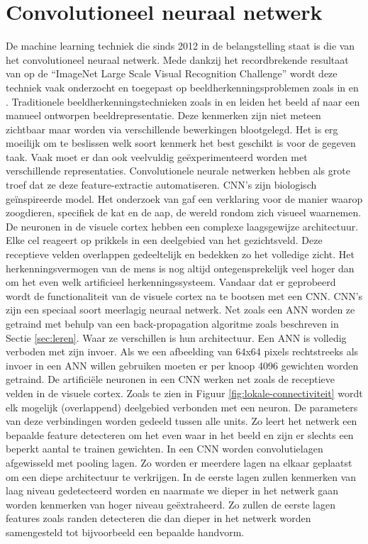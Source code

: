 \section{Convolutioneel neuraal netwerk}
De machine learning techniek die sinds 2012 in de belangstelling staat is die van het convolutioneel neuraal netwerk. Mede dankzij het recordbrekende resultaat van \cite{cnn-krizhevsky} op de ``ImageNet Large Scale Visual Recognition Challenge'' wordt deze techniek vaak onderzocht en toegepast op beeldherkenningsproblemen zoals in \cite{cnn-ji} en \cite{cnn-karpathy}.
\npar Traditionele beeldherkenningstechnieken zoals in \cite{perronnin2010improving} en \cite{jhuang2007biologically} leiden het beeld af naar een manueel ontworpen beeldrepresentatie. Deze kenmerken zijn niet meteen zichtbaar maar worden via verschillende bewerkingen blootgelegd. Het is erg moeilijk om te beslissen welk soort kenmerk het best geschikt is voor de gegeven taak. Vaak moet er dan ook veelvuldig ge\"experimenteerd worden met verschillende representaties.
\npar Convolutionele neurale netwerken hebben als grote troef dat ze deze feature-extractie automatiseren. CNN's zijn biologisch ge\"inspireerde model. Het onderzoek van \cite{hubel1968receptive} gaf een verklaring voor de manier waarop zoogdieren, specifiek de kat en de aap, de wereld rondom zich visueel waarnemen. De neuronen in de visuele cortex hebben een complexe laagsgewijze architectuur. Elke cel reageert op prikkels in een deelgebied van het gezichtsveld. Deze receptieve velden overlappen gedeeltelijk en bedekken zo het volledige zicht.
\npar Het herkenningsvermogen van de mens is nog altijd ontegensprekelijk veel hoger dan om het even welk artificieel herkenningssysteem. Vandaar dat er geprobeerd wordt de functionaliteit van de visuele cortex na te bootsen met een CNN. 
\npar CNN's zijn een speciaal soort meerlagig neuraal netwerk. Net zoals een ANN worden ze getraind met behulp van een back-propagation algoritme zoals beschreven in Sectie \ref{sec:leren}. Waar ze verschillen is hun architectuur. Een ANN is volledig verboden met zijn invoer. Als we een afbeelding van 64x64 pixels rechtstreeks als invoer in een ANN willen gebruiken moeten er per knoop 4096 gewichten worden getraind. De artifici\"ele neuronen in een CNN werken net zoals de receptieve velden in de visuele cortex.
\npar Zoals te zien in Figuur \ref{fig:lokale-connectiviteit} wordt elk mogelijk (overlappend) deelgebied verbonden met een neuron. De parameters van deze verbindingen worden gedeeld tussen alle units. Zo leert het netwerk een bepaalde feature detecteren om het even waar in het beeld en zijn er slechts een beperkt aantal te trainen gewichten.
\npar In een CNN worden convolutielagen afgewisseld met pooling lagen. Zo worden er meerdere lagen na elkaar geplaatst om een diepe architectuur te verkrijgen. In de eerste lagen zullen kenmerken van laag niveau gedetecteerd worden en naarmate we dieper in het netwerk gaan worden kenmerken van hoger niveau ge\"extraheerd. Zo zullen de eerste lagen features zoals randen detecteren die dan dieper in het netwerk worden samengesteld tot bijvoorbeeld een bepaalde handvorm.
 
